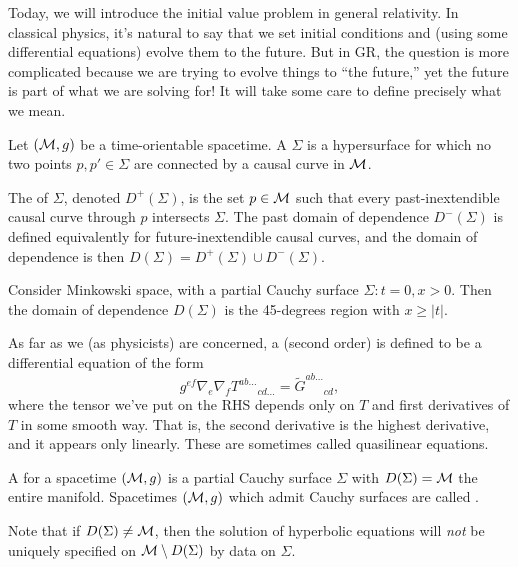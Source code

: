 Today, we will introduce the initial value problem in general relativity. In classical physics, it's natural to say that we set initial conditions and (using some differential equations) evolve them to the future. But in GR, the question is more complicated because we are trying to evolve things to ``the future,'' yet the future is part of what we are solving for! It will take some care to define precisely what we mean.

\begin{defn}
    Let $(\mathcal{M},g)$ be a time-orientable spacetime. A  $\Sigma$ is a hypersurface for which no two points $p,p'\in \Sigma$ are connected by a causal curve in $\mathcal{M}$.
\end{defn}
\begin{defn}
    The  of $\Sigma$, denoted $D^+(\Sigma)$, is the set $p\in \mathcal{M}$ such that every past-inextendible causal curve through $p$ intersects $\Sigma$. The past domain of dependence $D^-(\Sigma)$ is defined equivalently for future-inextendible causal curves, and the domain of dependence is then $D(\Sigma)=D^+(\Sigma)\cup D^-(\Sigma)$.
\end{defn}
\begin{exm}
    Consider Minkowski space, with a partial Cauchy surface $\Sigma:t=0,x >0$. Then the domain of dependence $D(\Sigma)$ is the 45-degrees region with $x\geq |t|$.
\end{exm}
\begin{defn}
    As far as we (as physicists) are concerned, a  (second order) is defined to be a differential equation of the form
    \begin{equation}
        g^{ef} \nabla_e \nabla_f T^{ab\ldots}{}_{cd\ldots} = \tilde G^{ab\ldots}{}_{cd},
    \end{equation}
    where the tensor we've put on the RHS depends only on $T$ and first derivatives of $T$ in some smooth way. That is, the second derivative is the highest derivative, and it appears only linearly. These are sometimes called quasilinear equations.
\end{defn}
\begin{defn}
    A  for a spacetime $(\mathcal{M},g)$ is a partial Cauchy surface $\Sigma$ with $D(\Sigma)=\mathcal{M}$ the entire manifold. Spacetimes $(\mathcal{M},g)$ which admit Cauchy surfaces are called .
\end{defn}
Note that if $D(\Sigma)\neq \mathcal{M}$, then the solution of hyperbolic equations will \emph{not} be uniquely specified on $\mathcal{M}\setminus D(\Sigma)$ by data on $\Sigma$.
